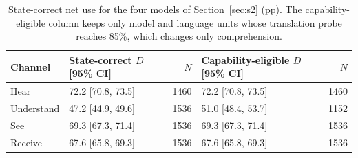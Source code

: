 \documentclass[11pt]{article}
\begin{document}
\begin{table}[!tp]
\centering\setlength{\tabcolsep}{4.5pt}\small
\begin{lrbox}{\OCtable}\begin{tabular*}{\linewidth}{@{\extracolsep{\fill}}llrlr@{}}
\toprule
\textbf{Channel} & \textbf{State-correct $D$ [95\% CI]} & \textbf{$N$} & \textbf{Capability-eligible $D$ [95\% CI]} & \textbf{$N$}\\
\midrule
Hear & 72.2 [70.8, 73.5] & 1460 & 72.2 [70.8, 73.5] & 1460\\
Understand & 47.2 [44.9, 49.6] & 1536 & 51.0 [48.4, 53.7] & 1152\\
See & 69.3 [67.3, 71.4] & 1536 & 69.3 [67.3, 71.4] & 1536\\
Receive & 67.6 [65.8, 69.3] & 1536 & 67.6 [65.8, 69.3] & 1536\\
\bottomrule
\end{tabular*}\end{lrbox}
\ifdim\wd\OCtable>\linewidth\PackageError{access-paper}{Table tab:stateboundary exceeds its column}{Revise the table layout.}\fi
\usebox{\OCtable}
\caption{State-correct net use for the four models of Section~\ref{sec:s2} (pp). The capability-eligible column keeps only model and language units whose translation probe reaches 85\%, which changes only comprehension.}
\label{tab:stateboundary}
\end{table}
\end{document}
